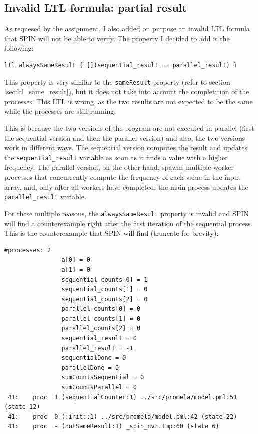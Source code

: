 \documentclass[a4paper, 11pt]{article}
\begin{document}
\subsection{Invalid LTL formula: partial result}

As requesed by the assignment, I also added on purpose an invalid LTL formula that SPIN will not be able to verify. The property I decided to add is the following:

\begin{lstlisting}[language=Promela, caption={Invalid LTL property that SPIN will not be able to verify}, captionpos=b, breaklines=true]
ltl alwaysSameResult { [](sequential_result == parallel_result) }
\end{lstlisting}

This property is very similar to the \texttt{sameResult} property (refer to section \ref{sec:ltl_same_result}), but it does not take into account the completition of the processes. This LTL is wrong, as the two results are not expected to be the same while the processes are still running.

This is because the two versions of the program are not executed in parallel (first the sequential version and then the parallel version) and also, the two versions work in different ways. The sequential version computes the result and updates the \texttt{sequential\_result} variable as soon as it finds a value with a higher frequency. The parallel version, on the other hand, spawns multiple worker processes that concurrently compute the frequency of each value in the input array, and, only after all workers have completed, the main process updates the \texttt{parallel\_result} variable.

For these multiple reasons, the \texttt{alwaysSameResult} property is invalid and SPIN will find a counterexample right after the first iteration of the sequential process. This is the counterexample that SPIN will find (truncate for brevity):

\begin{lstlisting}
#processes: 2
                a[0] = 0
                a[1] = 0
                sequential_counts[0] = 1
                sequential_counts[1] = 0
                sequential_counts[2] = 0
                parallel_counts[0] = 0
                parallel_counts[1] = 0
                parallel_counts[2] = 0
                sequential_result = 0
                parallel_result = -1
                sequentialDone = 0
                parallelDone = 0
                sumCountsSequential = 0
                sumCountsParallel = 0
 41:    proc  1 (sequentialCounter:1) ../src/promela/model.pml:51 (state 12)
 41:    proc  0 (:init::1) ../src/promela/model.pml:42 (state 22)
 41:    proc  - (notSameResult:1) _spin_nvr.tmp:60 (state 6)
\end{lstlisting}
\end{document}

